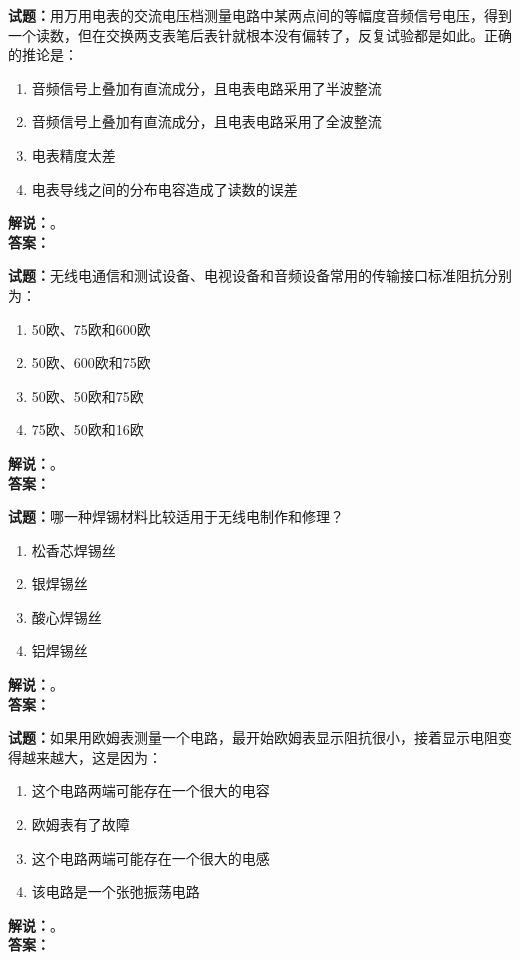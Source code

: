 \documentclass{ctexbook}
\begin{document}
\vspace{\baselineskip}

\noindent\textbf{试题：}用万用电表的交流电压档测量电路中某两点间的等幅度音频信号电压，得到一个读数，但在交换两支表笔后表针就根本没有偏转了，反复试验都是如此。正确的推论是：
\begin{enumerate}[leftmargin=3em]
  \item 音频信号上叠加有直流成分，且电表电路采用了半波整流
  \item 音频信号上叠加有直流成分，且电表电路采用了全波整流
  \item 电表精度太差
  \item 电表导线之间的分布电容造成了读数的误差
\end{enumerate}
\noindent\textbf{解说：}\textbf{}。\\\noindent\textbf{答案：}

\vspace{\baselineskip}

\noindent\textbf{试题：}无线电通信和测试设备、电视设备和音频设备常用的传输接口标准阻抗分别为：
\begin{enumerate}[leftmargin=3em]
  \item 50欧、75欧和600欧
  \item 50欧、600欧和75欧
  \item 50欧、50欧和75欧
  \item 75欧、50欧和16欧
\end{enumerate}
\noindent\textbf{解说：}\textbf{}。\\\noindent\textbf{答案：}

\vspace{\baselineskip}

\noindent\textbf{试题：}哪一种焊锡材料比较适用于无线电制作和修理？
\begin{enumerate}[leftmargin=3em]
  \item 松香芯焊锡丝
  \item 银焊锡丝
  \item 酸心焊锡丝
  \item 铝焊锡丝
\end{enumerate}
\noindent\textbf{解说：}\textbf{}。\\\noindent\textbf{答案：}

\vspace{\baselineskip}

\noindent\textbf{试题：}如果用欧姆表测量一个电路，最开始欧姆表显示阻抗很小，接着显示电阻变得越来越大，这是因为：
\begin{enumerate}[leftmargin=3em]
  \item 这个电路两端可能存在一个很大的电容
  \item 欧姆表有了故障
  \item 这个电路两端可能存在一个很大的电感
  \item 该电路是一个张弛振荡电路
\end{enumerate}
\noindent\textbf{解说：}\textbf{}。\\\noindent\textbf{答案：}
\end{document}
